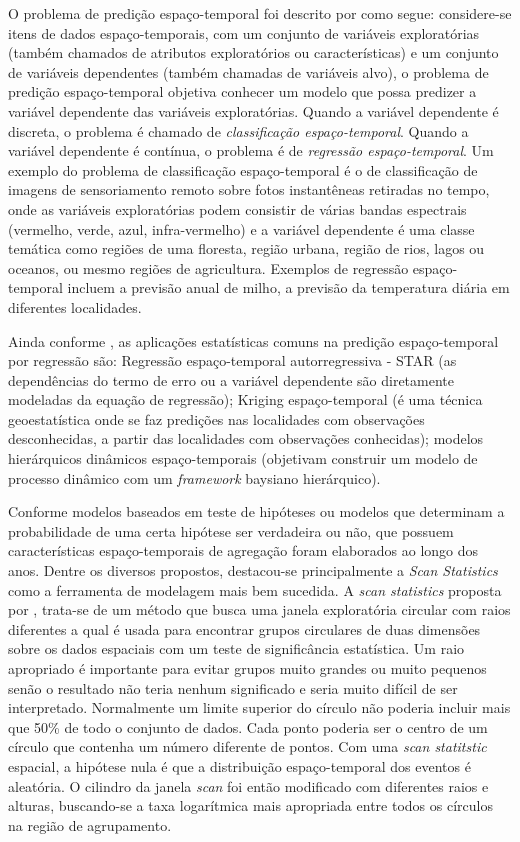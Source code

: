 O problema de predição espaço-temporal foi descrito por \cite{shekharetal2015} como segue: considere-se itens de dados espaço-temporais, com um conjunto de variáveis exploratórias (também chamados de atributos exploratórios ou características) e um conjunto de variáveis dependentes (também chamadas de variáveis alvo), o problema de predição espaço-temporal objetiva conhecer um modelo que possa predizer a variável dependente das variáveis exploratórias. Quando a variável dependente é discreta, o problema é chamado de \emph{classificação espaço-temporal}. Quando a variável dependente é contínua, o problema é de \emph{regressão espaço-temporal}. Um exemplo do problema de classificação espaço-temporal é o de classificação de imagens de sensoriamento remoto sobre fotos instantêneas retiradas no tempo, onde 
as variáveis exploratórias podem consistir de várias bandas espectrais (vermelho, verde, azul, infra-vermelho) e a variável dependente é uma classe temática como regiões de uma floresta, região urbana, região de rios, lagos ou oceanos, ou mesmo regiões de agricultura. Exemplos de regressão espaço-temporal incluem a previsão anual de milho, a previsão da temperatura diária em diferentes localidades.

Ainda conforme \cite{shekharetal2015}, as aplicações  estatísticas comuns  na predição espaço-temporal por regressão são: Regressão espaço-temporal autorregressiva - \acrshort{STAR} (as dependências do termo de erro ou a variável dependente são diretamente modeladas da equação de regressão); Kriging espaço-temporal (é uma técnica geoestatística onde se faz predições nas localidades com observações desconhecidas, a partir das localidades com observações conhecidas); modelos hierárquicos dinâmicos espaço-temporais (objetivam construir um modelo de processo dinâmico com um \emph{framework} baysiano hierárquico).

Conforme \cite{Zhicheng:2019} modelos baseados em teste de hipóteses ou modelos que determinam a probabilidade de uma certa hipótese ser verdadeira ou não, que possuem características espaço-temporais de agregação foram elaborados ao longo dos anos. Dentre os diversos propostos, destacou-se principalmente a \emph{Scan Statistics} como a ferramenta de modelagem mais bem sucedida. A \emph{scan statistics} proposta por , trata-se de um método que busca uma janela exploratória circular com raios diferentes a qual é usada para encontrar grupos circulares de duas dimensões sobre os dados espaciais com um teste de significância estatística. Um raio apropriado é importante para evitar grupos muito grandes ou muito pequenos senão o resultado não teria nenhum significado e seria muito difícil de ser interpretado. Normalmente um limite superior do círculo não poderia incluir mais que 50\% de todo o conjunto de dados. Cada ponto poderia ser o centro de um círculo que contenha um número diferente de pontos. Com uma \emph{scan statitstic} espacial, a hipótese nula é que a distribuição espaço-temporal dos eventos é aleatória. O cilindro da janela \emph{scan} foi então modificado com diferentes raios e alturas, buscando-se a  taxa logarítmica mais apropriada entre todos os círculos na região de agrupamento.

